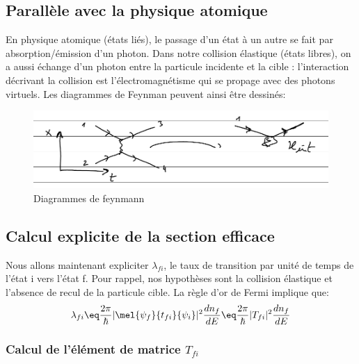\subsection{Parallèle avec la physique atomique}

En physique atomique (états liés), le passage d'un état à un autre se fait par absorption/émission d'un photon. Dans notre collision élastique (états libres), on a aussi échange d'un photon entre la particule incidente et la cible : l'interaction décrivant la collision est l'électromagnétisme qui se propage avec des photons virtuels. Les diagrammes de Feynman peuvent ainsi être dessinés:
 \begin{figure}[H]
    \centering
    \includegraphics[scale=0.80]{Images4/partie 4 - interaction.PNG}
    \caption{Diagrammes de feynmann}
    \label{fig:feynmann_diagram}
\end{figure}



\subsection{Calcul explicite de la section efficace}


Nous allons maintenant expliciter $\lambda_{fi}$, le taux de transition par unité de temps de l'état i vers l'état f. Pour rappel, nos hypothèses sont la collision élastique et l'absence de recul de la particule cible. La règle d'or de Fermi implique que:
\begin{equation*}
  \lambda_{fi} 
  \eq
  \frac{2\pi}{\hbar }|\mel{\psi_f}{t_{fi}}{\psi_i}|^2 \dfrac{dn_f}{dE}
  \eq
  \frac{2\pi}{\hbar }|T_{fi}|^2 \dfrac{dn_f}{dE}
\end{equation*}

\subsubsection{Calcul de l'élément de matrice $T_{fi}$}\label{calcul_Tfi}

